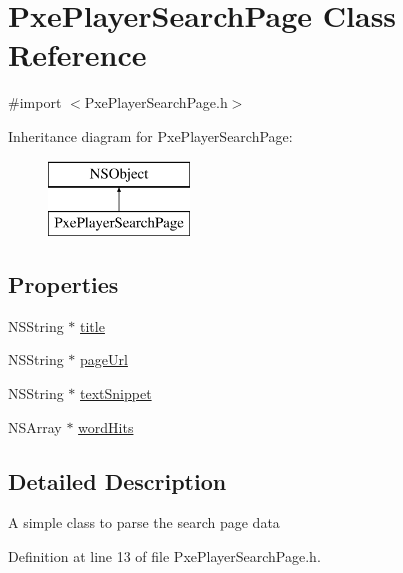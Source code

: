 \hypertarget{interface_pxe_player_search_page}{\section{Pxe\-Player\-Search\-Page Class Reference}
\label{interface_pxe_player_search_page}
}


{\ttfamily \#import $<$Pxe\-Player\-Search\-Page.\-h$>$}

Inheritance diagram for Pxe\-Player\-Search\-Page\-:\begin{figure}[H]
\begin{center}
\leavevmode
\includegraphics[height=2.000000cm]{interface_pxe_player_search_page}
\end{center}
\end{figure}
\subsection*{Properties}
\begin{DoxyCompactItemize}
\item 
N\-S\-String $\ast$ \hyperlink{interface_pxe_player_search_page_a6a30adba13a3bc04aba74e5c72a68d45}{title}
\item 
N\-S\-String $\ast$ \hyperlink{interface_pxe_player_search_page_af61fb16410b027d925410724f7654f9a}{page\-Url}
\item 
N\-S\-String $\ast$ \hyperlink{interface_pxe_player_search_page_abcd4dc97b1e87dd2cda9dded238302a9}{text\-Snippet}
\item 
N\-S\-Array $\ast$ \hyperlink{interface_pxe_player_search_page_a221899b9f7e9652b334ffc8d4450d31d}{word\-Hits}
\end{DoxyCompactItemize}


\subsection{Detailed Description}
A simple class to parse the search page data 

Definition at line 13 of file Pxe\-Player\-Search\-Page.\-h.



